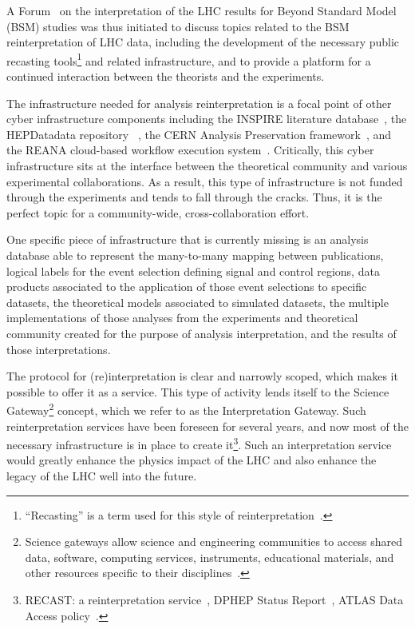 \documentclass[12pt,a4paper]{article}
\begin{document}
A Forum~\cite{LHCInterpretationForum} on the interpretation of the LHC results for Beyond Standard Model (BSM) studies was thus initiated to discuss topics related to the BSM reinterpretation of LHC data, including the development of the necessary public recasting tools\footnote{``Recasting'' is a term used for this style of reinterpretation~\cite{Cranmer:1299950}.} and related infrastructure, and to provide a platform for a continued interaction between the theorists and the experiments. 

The infrastructure needed for analysis reinterpretation is a focal point of other cyber infrastructure components including the INSPIRE literature database~\cite{INSPIRE}, the HEPDatadata repository~\cite{HEPDataRepo} , the CERN Analysis Preservation framework~\cite{CAP}, and the REANA cloud-based workflow execution system~\cite{REANA}. Critically, this cyber infrastructure sits at the interface between the theoretical community and various experimental collaborations. As a result, this type of infrastructure is not funded through the experiments and tends to fall through the cracks. Thus, it is the perfect topic for a community-wide, cross-collaboration effort.

One specific piece of infrastructure that is currently missing is an analysis database able to represent the many-to-many mapping between publications, logical labels for the event selection defining signal and control regions, data products associated to the application of those event selections to specific datasets, the theoretical models associated to simulated datasets, the multiple implementations of those analyses from the experiments and theoretical community created for the purpose of analysis interpretation, and the results of those interpretations.

The protocol for (re)interpretation is clear and narrowly scoped, which makes it possible to offer it as a service. This type of activity lends itself to the Science Gateway\footnote{Science gateways allow science and engineering communities to access shared data, software, computing services, instruments, educational materials, and other resources specific to their disciplines~\cite{SciGateway}.} concept, which we refer to as the Interpretation Gateway. Such reinterpretation services have been foreseen for several years, and now most of the necessary infrastructure is in place to create it\footnote{RECAST: a reinterpretation service~\cite{Cranmer:1299950}, DPHEP Status Report~\cite{Akopov:2012bm}, ATLAS Data Access policy~\cite{ATL-CB-PUB-2015-001}.}. Such an interpretation service would greatly enhance the physics impact of the LHC and also enhance the legacy of the LHC well into the future.
\end{document}

